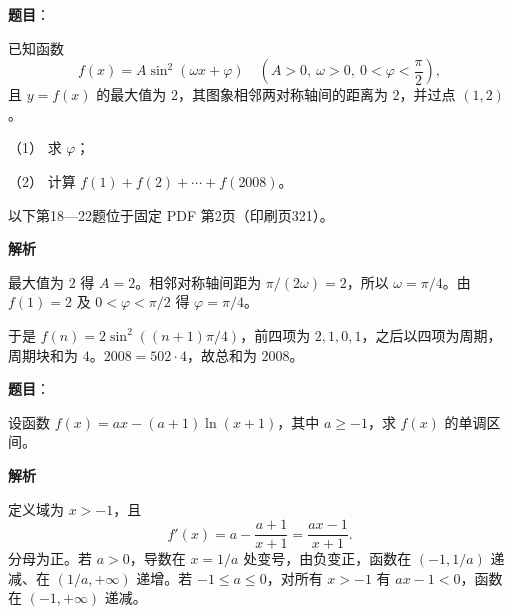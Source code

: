 \begin{answer}

\textbf{题目}：

已知函数
\nopagebreak[4]
\[
f(x)=A\sin^2(\omega x+\varphi)\quad
\left(A>0,\ \omega>0,\ 0<\varphi<\dfrac{\pi}{2}\right),
\]
且 $y=f(x)$ 的最大值为 $2$，其图象相邻两对称轴间的距离为 $2$，并过点 $(1,2)$。

（1） 求 $\varphi$；

（2） 计算 $f(1)+f(2)+\cdots+f(2008)$。

\begin{gktip}
以下第18—22题位于固定 PDF 第2页（印刷页321）。
\end{gktip}

\textbf{解析}


最大值为 $2$ 得 $A=2$。相邻对称轴间距为 $\pi/(2\omega)=2$，所以 $\omega=\pi/4$。由 $f(1)=2$ 及 $0<\varphi<\pi/2$ 得 $\varphi=\pi/4$。


于是 $f(n)=2\sin^2((n+1)\pi/4)$，前四项为 $2,1,0,1$，之后以四项为周期，周期块和为 $4$。$2008=502\cdot4$，故总和为 $2008$。



\end{answer}
\begin{answer}

\textbf{题目}：

设函数 $f(x)=ax-(a+1)\ln(x+1)$，其中 $a\ge -1$，求 $f(x)$ 的单调区间。

\textbf{解析}

定义域为 $x>-1$，且
\nopagebreak[4]
\[
f'(x)=a-\frac{a+1}{x+1}=\frac{ax-1}{x+1}.
\]
分母为正。若 $a>0$，导数在 $x=1/a$ 处变号，由负变正，函数在 $(-1,1/a)$ 递减、在 $(1/a,+\infty)$ 递增。若 $-1\le a\le0$，对所有 $x>-1$ 有 $ax-1<0$，函数在 $(-1,+\infty)$ 递减。


\end{answer}
